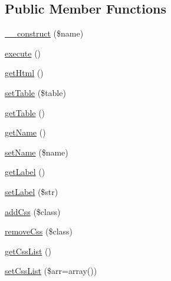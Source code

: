 \subsection*{Public Member Functions}
\begin{DoxyCompactItemize}
\item 
\hyperlink{classTk_1_1Table_1_1Action_1_1Iface_a3da0e0ebded788b5f887988298a8a0af}{\+\_\+\+\_\+construct} (\$name)
\item 
\hyperlink{classTk_1_1Table_1_1Action_1_1Iface_a8aea9f2a29f2d4a256bcd1d3fc89f2ce}{execute} ()
\item 
\hyperlink{classTk_1_1Table_1_1Action_1_1Iface_a900841637cd963f469d8b0a55c691490}{get\+Html} ()
\item 
\hyperlink{classTk_1_1Table_1_1Action_1_1Iface_a6d2c53a8b5d4735c0e454ca63e582b60}{set\+Table} (\$table)
\item 
\hyperlink{classTk_1_1Table_1_1Action_1_1Iface_a8c8c10240620ec4f7caac335f5d388e1}{get\+Table} ()
\item 
\hyperlink{classTk_1_1Table_1_1Action_1_1Iface_ab941a3fabf0613d202a93ac36eaece80}{get\+Name} ()
\item 
\hyperlink{classTk_1_1Table_1_1Action_1_1Iface_a3bff8f4e4bb7348fe5942c38b494e02e}{set\+Name} (\$name)
\item 
\hyperlink{classTk_1_1Table_1_1Action_1_1Iface_ae665bc86c92aef1f43ebb896bf17025d}{get\+Label} ()
\item 
\hyperlink{classTk_1_1Table_1_1Action_1_1Iface_ab7fbf47831804987dda2528da0e8487d}{set\+Label} (\$str)
\item 
\hyperlink{classTk_1_1Table_1_1Action_1_1Iface_af2c7cf179232d0f11b7668992711668f}{add\+Css} (\$class)
\item 
\hyperlink{classTk_1_1Table_1_1Action_1_1Iface_a170ec15504f1ba87c33efa9c622436c6}{remove\+Css} (\$class)
\item 
\hyperlink{classTk_1_1Table_1_1Action_1_1Iface_add82315918344c7f79b8e6760d9f59e1}{get\+Css\+List} ()
\item 
\hyperlink{classTk_1_1Table_1_1Action_1_1Iface_a47f2d195cda44c8ca084243850f0693f}{set\+Css\+List} (\$arr=array())
\end{DoxyCompactItemize}
